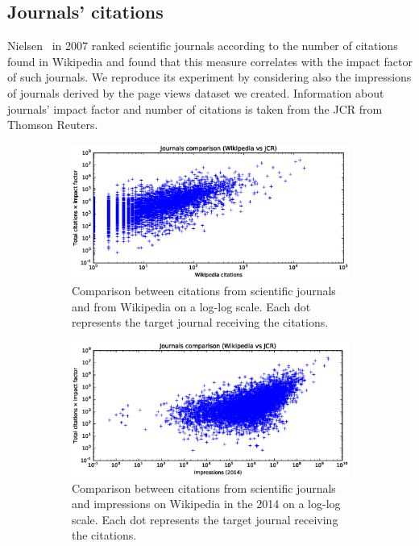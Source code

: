 \subsection{Journals' citations}
Nielsen~\cite{Nielsen2007} in 2007 ranked scientific journals according to the number of citations found in Wikipedia and found that this measure correlates with the impact factor of such journals.
We reproduce its experiment by considering also the impressions of journals derived by the page views dataset we created.
Information about journals' impact factor and number of citations is taken from the \ac{JCR} from Thomson Reuters.

\begin{figure}[h]
    \centering
    \begin{subfigure}{1\textwidth}
        \centering
        \includegraphics[keepaspectratio=true, width=\textwidth]{assets/journals_compare_appearances}
        \caption{Comparison between citations from scientific journals and from Wikipedia on a log-log scale. Each dot represents the target journal receiving the citations.}
\label{fig:journals_compare_appearances}
    \end{subfigure}
    \begin{subfigure}{1\textwidth}
        \centering
        \includegraphics[keepaspectratio=true, width=\textwidth]{assets/journals_compare_impressions2014}
        \caption{Comparison between citations from scientific journals and impressions on Wikipedia in the 2014 on a log-log scale. Each dot represents the target journal receiving the citations.}
\label{fig:journals_compare_impressions2014}
    \end{subfigure}
    \caption{}
\end{figure}

